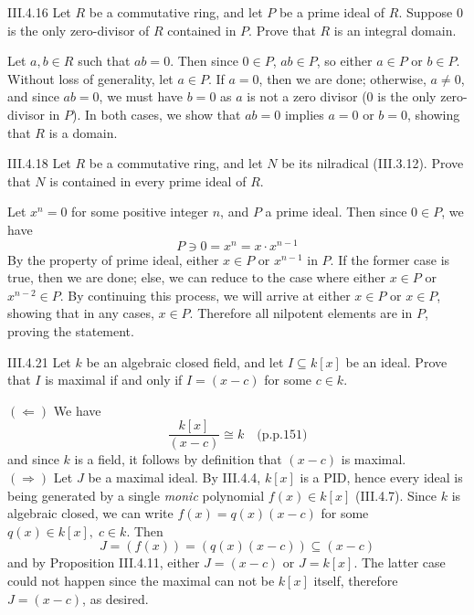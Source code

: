 \begin{problem}{III.4.16}
Let $R$ be a commutative ring, and let $P$ be a prime ideal of $R$. Suppose $0$ is the only zero-divisor of $R$ contained in $P$. Prove that $R$ is an integral domain. 
\end{problem}
\begin{pf}
Let $a,b \in R$ such that $ab = 0$. Then since $0 \in P$, $ab \in P$, so either $a\in P$ or $b \in P$. Without loss of generality, let $a \in P$. If $a = 0$, then we are done; otherwise, $a \neq 0$, and since $ab = 0$, we must have $b = 0$ as $a$ is not a zero divisor ($0$ is the only zero-divisor in $P$). In both cases, we show that $ab = 0$ implies $a = 0$ or $b = 0$, showing that $R$ is a domain.
\end{pf}

\begin{problem}{III.4.18}
Let $R$ be a commutative ring, and let $N$ be its nilradical (III.3.12). Prove that $N$ is contained in every prime ideal of $R$.
\end{problem}
\begin{pf}
Let $x^n = 0$ for some positive integer $n$, and $P$ a prime ideal. Then since $0 \in P$, we have
\[
P \ni 0 = x^n = x \cdot x^{n-1}
\]
By the property of prime ideal, either $x \in P$ or $x^{n-1}$ in $P$. If the former case is true, then we are done; else, we can reduce to the case where either $x \in P$ or $x^{n-2} \in P$. By continuing this process, we will arrive at either $x \in P$ or $x \in P$, showing that in any cases, $x \in P$. Therefore all nilpotent elements are in $P$, proving the statement. 
\end{pf}

\begin{problem}{III.4.21}
Let $k$ be an algebraic closed field, and let $I \subseteq k[x]$ be an ideal. Prove that $I$ is maximal if and only if $I = (x-c)$ for some $c \in k$.
\end{problem}
\begin{pf}

\noindent $(\Leftarrow)$ We have 
\[
\frac{k[x]}{(x-c)} \cong k 	\quad \text{(p.p.151)}	
\]
and since $k$ is a field, it follows by definition that $(x-c)$ is maximal. \\
$(\Rightarrow)$ Let $J$ be a maximal ideal. By III.4.4, $k[x]$ is a PID, hence every ideal is being generated by a single \emph{monic} polynomial $f(x) \in k[x]$ (III.4.7). Since $k$ is algebraic closed, we can write $f(x) = q(x)(x-c)$ for some $q(x) \in k[x],\; c \in k$. Then  
\[
J = (f(x)) = (q(x)(x-c)) \subseteq (x-c)
\]
and by Proposition III.4.11, either $J = (x-c)$ or $J = k[x]$. The latter case could not happen since the maximal can not be $k[x]$ itself, therefore $J = (x-c)$, as desired. 
\end{pf}

